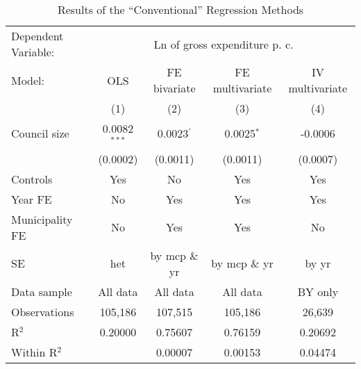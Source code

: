
\begin{table}
   \caption{\label{tab:conv_results} Results of the ``Conventional'' Regression Methods}
   \centering
   \begin{tabular}{lcccc}
      \tabularnewline \midrule \midrule
      Dependent Variable: & \multicolumn{4}{c}{Ln of gross expenditure p. c.}\\
      Model:        & \acs{OLS}      & \acs{FE} bivariate    & \acs{FE} multivariate  & \acs{IV} multivariate \\    
                    & (1)            & (2)                   & (3)                    & (4)\\  
      \midrule
      Council size  & 0.0082$^{***}$ & 0.0023$^{'}$          & 0.0025$^{*}$           & -0.0006\\   
                    & (0.0002)       & (0.0011)              & (0.0011)               & (0.0007)\\   
      \midrule
      Controls      & Yes            & No                    & Yes                    & Yes\\  
      Year \ac{FE}  & No             & Yes                   & Yes                    & Yes\\  
      Municipality \ac{FE}   & No    & Yes                   & Yes                    & No\\  
      \acs{SE} & \acs{het} & by \acs{mcp} \& \acs{yr} & by \acs{mcp} \& \acs{yr} & by \acs{yr}\\
      \midrule
      Data sample   & All data       & All data              & All data               & \acs{BY} only\\   
      Observations  & 105,186        & 107,515               & 105,186                & 26,639\\  
      R$^2$         & 0.20000        & 0.75607               & 0.76159                & 0.20692\\  
      Within R$^2$  &                & 0.00007               & 0.00153                & 0.04474\\  
      \midrule \midrule
   \end{tabular}
   
   \par {}
\end{table}


